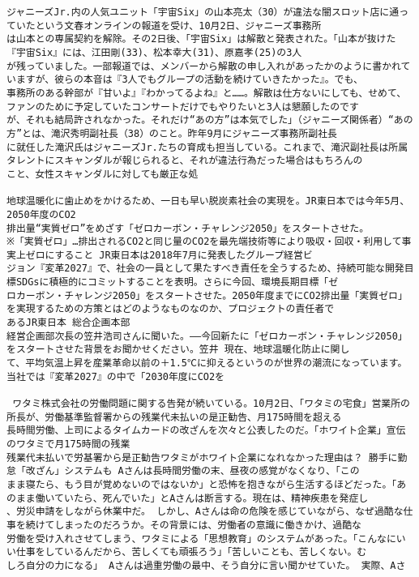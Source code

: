 \documentclass[11pt]{article}
\begin{document}
    \begin{Verbatim}[commandchars=\\\{\}]
 ジャニーズJr.内の人気ユニット「宇宙Six」の山本亮太（30）が違法な闇スロット店に通っていたという文春オンラインの報道を受け、10月2日、ジャニーズ事務所
は山本との専属契約を解除。その2日後、「宇宙Six」は解散と発表された。「山本が抜けた『宇宙Six』には、江田剛(33)、松本幸大(31)、原嘉孝(25)の3人
が残っていました。一部報道では、メンバーから解散の申し入れがあったかのように書かれていますが、彼らの本音は『3人でもグループの活動を続けていきたかった』。でも、
事務所のある幹部が『甘いよ』『わかってるよね』と……。解散は仕方ないにしても、せめて、ファンのために予定していたコンサートだけでもやりたいと3人は懇願したのです
が、それも結局許されなかった。それだけ“あの方”は本気でした」（ジャニーズ関係者）“あの方”とは、滝沢秀明副社長（38）のこと。昨年9月にジャニーズ事務所副社長
に就任した滝沢氏はジャニーズJr.たちの育成も担当している。これまで、滝沢副社長は所属タレントにスキャンダルが報じられると、それが違法行為だった場合はもちろんの
こと、女性スキャンダルに対しても厳正な処

地球温暖化に歯止めをかけるため、一日も早い脱炭素社会の実現を。JR東日本では今年5月、2050年度のCO2
排出量“実質ゼロ”をめざす「ゼロカーボン・チャレンジ2050」をスタートさせた。
※「実質ゼロ」…排出されるCO2と同じ量のCO2を最先端技術等により吸収・回収・利用して事実上ゼロにすること JR東日本は2018年7月に発表したグループ経営ビ
ジョン『変革2027』で、社会の一員として果たすべき責任を全うするため、持続可能な開発目標SDGsに積極的にコミットすることを表明。さらに今回、環境長期目標「ゼ
ロカーボン・チャレンジ2050」をスタートさせた。2050年度までにCO2排出量「実質ゼロ」を実現するための方策とはどのようなものなのか、プロジェクトの責任者で
あるJR東日本 総合企画本部
経営企画部次長の笠井浩司さんに聞いた。――今回新たに「ゼロカーボン・チャレンジ2050」をスタートさせた背景をお聞かせください。笠井 現在、地球温暖化防止に関し
て、平均気温上昇を産業革命以前の＋1.5℃に抑えるというのが世界の潮流になっています。当社では『変革2027』の中で「2030年度にCO2を

 ワタミ株式会社の労働問題に関する告発が続いている。10月2日、「ワタミの宅食」営業所の所長が、労働基準監督署からの残業代未払いの是正勧告、月175時間を超える
長時間労働、上司によるタイムカードの改ざんを次々と公表したのだ。「ホワイト企業」宣伝のワタミで月175時間の残業
残業代未払いで労基署から是正勧告ワタミがホワイト企業になれなかった理由は？ 勝手に勤怠「改ざん」システムも Aさんは長時間労働の末、昼夜の感覚がなくなり、「この
まま寝たら、もう目が覚めないのではないか」と恐怖を抱きながら生活するほどだった。「あのまま働いていたら、死んでいた」とAさんは断言する。現在は、精神疾患を発症し
、労災申請をしながら休業中だ。 しかし、Aさんは命の危険を感じていながら、なぜ過酷な仕事を続けてしまったのだろうか。その背景には、労働者の意識に働きかけ、過酷な
労働を受け入れさせてしまう、ワタミによる「思想教育」のシステムがあった。「こんなにいい仕事をしているんだから、苦しくても頑張ろう」「苦しいことも、苦しくない。む
しろ自分の力になる」 Aさんは過重労働の最中、そう自分に言い聞かせていた。 実際、Aさ

    \end{Verbatim}
\end{document}

